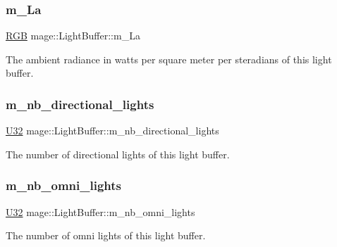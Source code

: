 \subsubsection{\texorpdfstring{m\+\_\+\+La}{m\_La}}
{\footnotesize\ttfamily \hyperlink{structmage_1_1_r_g_b}{R\+GB} mage\+::\+Light\+Buffer\+::m\+\_\+\+La}

The ambient radiance in watts per square meter per steradians of this light buffer. \hypertarget{structmage_1_1_light_buffer_a099a0307b0feacddcf01921f97752307}{}\label{structmage_1_1_light_buffer_a099a0307b0feacddcf01921f97752307} 
\subsubsection{\texorpdfstring{m\+\_\+nb\+\_\+directional\+\_\+lights}{m\_nb\_directional\_lights}}
{\footnotesize\ttfamily \hyperlink{namespacemage_a41c104c036fba3756a74e19f793eeaa1}{U32} mage\+::\+Light\+Buffer\+::m\+\_\+nb\+\_\+directional\+\_\+lights}

The number of directional lights of this light buffer. \hypertarget{structmage_1_1_light_buffer_ad576a2cf65d5c84761812144274ac779}{}\label{structmage_1_1_light_buffer_ad576a2cf65d5c84761812144274ac779} 
\subsubsection{\texorpdfstring{m\+\_\+nb\+\_\+omni\+\_\+lights}{m\_nb\_omni\_lights}}
{\footnotesize\ttfamily \hyperlink{namespacemage_a41c104c036fba3756a74e19f793eeaa1}{U32} mage\+::\+Light\+Buffer\+::m\+\_\+nb\+\_\+omni\+\_\+lights}

The number of omni lights of this light buffer. \hypertarget{structmage_1_1_light_buffer_a3f2bee584a95ff4e41a02558c45bba94}{}\label{structmage_1_1_light_buffer_a3f2bee584a95ff4e41a02558c45bba94} 
